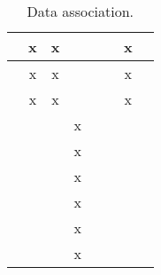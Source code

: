 \documentclass{article}
\begin{document}
\begin{table}
\begin{tabular}{|c|c|c|c|c|c|c|c|}
			\cite{kundu2014eccv} & x & x &  &  &  & x &  \\ 
			\hline 			 
			\cite{sengupta2013icra} & x & x &  &  &  & x &  \\ 
			\hline 			 
			\cite{hane2013cvpr} & x & x &  &  &  & x &  \\ 
			\hline 			 
			\cite{yamauchi1997cira,yamauchi1998frontier,wang2011frontier} &  &  & x &  &  &  &  \\ 
			\hline 			 
			\cite{senarathne2013efficient,keidar2012robot} &  &  & x &  &  &  &  \\ 
			\hline 			 
			\cite{oriolo2004icra,freda2005icra} &  &  & x &  &  &  &  \\ 
			\hline 			 
			\cite{lavalle1998rapidly} &  &  & x &  &  &  &  \\ 
			\hline 			 
			\cite{bircher2016icra} & & & x &  &  &  &  \\ 
			\hline 			 
			\cite{el2013improved,franchi2009sensor} &  &  & x &  &  &  &  \\ 
			\hline 			 
		\end{tabular}
		\caption{Data association.}
		\label{tab:assoc}
	\end{table}
	
	\clearpage
	
	
	
\end{document}

